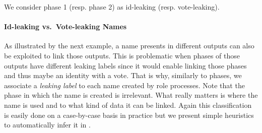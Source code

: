 \begin{example}
  \label{ex:foo-phase}
  We consider phase 1 (resp. phase 2) as id-leaking (resp. vote-leaking).
\end{example}


\paragraph{\textbf{Id-leaking vs.~Vote-leaking Names}}
As illustrated by the next example, a name presents in different outputs can also be exploited 
 to link those outputs. This is problematic when phases of
 those outputs have different leaking labels
since it would enable linking those phases and thus maybe an identity with a vote.
That is why, similarly to phases, we associate a {\em leaking label} to each name created by role processes.
Note that the phase in which the name is created is irrelevant. What really matters is where the name
is used and to what kind of data it can be linked.
Again this classification is easily done on a case-by-case basis in practice
but we present simple heuristics to automatically infer it
in .


